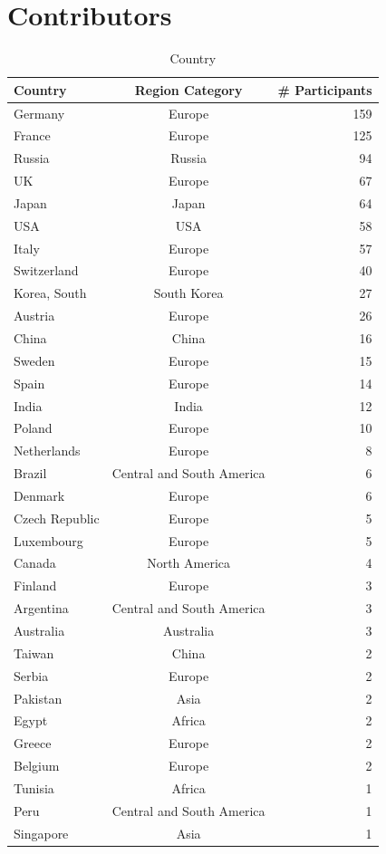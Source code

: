 \documentclass[preprint,5p,times]{elsarticle}
\def\Countries{Contributors}%
\begin{document}
\newpage
\section{\Countries}
\label{app:countries}

\begin{table}[htb]%
\begin{center}%
\caption{Country}
{\small
\begin{tabular}{l|c|r}%
\hline%
Country & Region Category & \# Participants \\%
\hline%
Germany&Europe&159\\%
France&Europe&125\\%
Russia&Russia&94\\%
UK&Europe&67\\%
Japan&Japan&64\\%
USA&USA&58\\%
Italy&Europe&57\\%
Switzerland&Europe&40\\%
Korea, South&South Korea&27\\%
Austria&Europe&26\\%
China&China&16\\%
Sweden&Europe&15\\%
Spain&Europe&14\\%
India&India&12\\%
Poland&Europe&10\\%
Netherlands&Europe&8\\%
Brazil&{\small Central and South America}&6\\%
Denmark&Europe&6\\%
Czech Republic&Europe&5\\%
Luxembourg&Europe&5\\%
Canada&North America&4\\%
Finland&Europe&3\\%
Argentina&{\small Central and South America}&3\\%
Australia&Australia&3\\%
Taiwan&China&2\\%
Serbia&Europe&2\\%
Pakistan&Asia&2\\%
Egypt&Africa&2\\%
Greece&Europe&2\\%
Belgium&Europe&2\\%
Tunisia&Africa&1\\%
Peru&{\small Central and South America}&1\\%
Singapore&Asia&1\\%

\end{tabular}}
\end{center}
\end{table}
\end{document}
